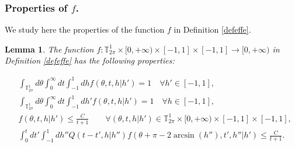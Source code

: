 \documentclass[a4paper,10pt,reqno]{amsart}
\newtheorem{lemma}{Lemma}[section]
\numberwithin{equation}{subsection}
\numberwithin{figure}{subsection}
\begin{document}
\subsubsection{Properties of $f$.}
We study here the properties of the function $f$ in Definition \ref{defeffe}. 
\begin{lemma}\label{propreffe}
The function $f:\mathbb{T}^1_{2\pi}\times[0,+\infty)\times[-1,1]\times[-1,1]\to[0,+\infty)$ in Definition \ref{defeffe} has the following properties:

\begin{align}
\label{fint1}&\int_{\mathbb{T}^1_{2\pi}}d\theta\int_0^{\infty}dt\int_{-1}^1dhf(\theta,t,h|h')=1\quad\forall h'\in[-1,1],
\\
\label{fint1dinuovo}&\int_{\mathbb{T}^1_{2\pi}}d\theta\int_0^{\infty}dt\int_{-1}^1dh'f(\theta,t,h|h')=1\quad\forall h\in[-1,1],
\\
\label{deceffe}&f(\theta,t,h|h')\leq\frac{C}{t+1}\qquad\forall(\theta,t,h|h')\in\mathbb{T}^1_{2\pi}\times[0,+\infty)\times[-1,1]\times[-1,1],
\\
\label{decQf}&\int_0^tdt'\int_{-1}^1dh''Q(t-t',h|h'')f(\theta+\pi-2\arcsin(h''),t',h''|h')\leq \frac{C}{t+1}.
\end{align}

\end{lemma}
\end{document}
